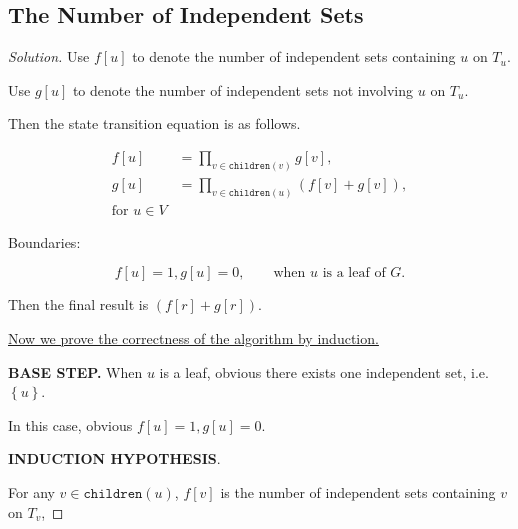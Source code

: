 \documentclass{article}
\newcommand{\set}[1]{\left\{#1\right\}}
\newenvironment{solution}{\begin{proof}[\noindent\it Solution]}{\end{proof}}
\begin{document}
\subsection{The Number of Independent Sets}
\vspace{1em}
\begin{solution}
    Use $f[u]$ to denote the number of independent sets containing $u$ on $T_u$.
    
    \hspace{2.6em}
    Use $g[u]$ to denote the number of independent sets not involving $u$ on $T_u$.
    
    \hspace{2.6em}
    Then the state transition equation is as follows.
    
    \vspace{-2em}
    \begin{align*}
        f[u] &= \prod_{v\in\mathtt{children}(v)}g[v], \\
        g[u] &= \prod_{v\in\mathtt{children}(u)}(f[v]+g[v]), \\
        \text{for }u\in V
    \end{align*}
    
    \vspace{-1em} \hspace{2.6em}
    Boundaries:
    
    \vspace{-1.5em}
    $$f[u]=1,g[u]=0,\qquad\text{when }u\text{ is a leaf of $G$.}$$
    
    \hspace{2.6em}
    Then the final result is $(f[r]+g[r]).$
    
    \vspace{3em} \hspace{2.6em}
    \underline{Now we prove the correctness of the algorithm by induction.}
    
    \hspace{2.6em}
    \textbf{BASE STEP.} When $u$ is a leaf, obvious there exists one independent set, i.e. $\set{u}$.
    
    
    \hspace{9.7em}
    In this case, obvious $f[u]=1, g[u]=0.$
    
    \vspace{1em} \hspace{2.6em}
    \textbf{INDUCTION HYPOTHESIS}.
    
    \hspace{5em}
    For any $v\in \mathtt{children}(u)$, $f[v]$ is the number of independent sets containing $v$ on $T_v$,
    

\end{solution}
\end{document}
